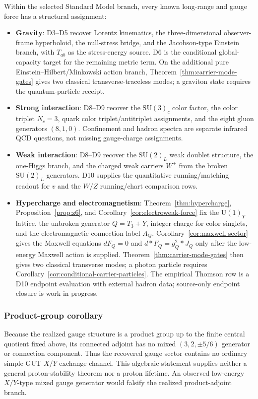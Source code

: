 \documentclass[11pt]{article}
\newcommand{\SU}{\mathrm{SU}}
\newcommand{\U}{\mathrm{U}}
\begin{document}
Within the selected Standard Model branch, every known long-range and gauge
force has a structural assignment:
\begin{itemize}[leftmargin=2em]
\item \textbf{Gravity}: D3--D5 recover Lorentz kinematics, the three-dimensional observer-frame hyperboloid, the null-stress bridge, and the Jacobson-type Einstein branch, with \(T_{ab}\) as the stress-energy source. D6 is the conditional global-capacity target for the remaining metric term. On the additional pure Einstein--Hilbert/Minkowski action branch, Theorem~\ref{thm:carrier-mode-gates} gives two classical transverse-traceless modes; a graviton state requires the quantum-particle receipt.
\item \textbf{Strong interaction}: D8--D9 recover the \(\SU(3)_c\) color factor, the color triplet \(N_c=3\), quark color triplet/antitriplet assignments, and the eight gluon generators \((8,1,0)\). Confinement and hadron spectra are separate infrared QCD questions, not missing gauge-charge assignments.
\item \textbf{Weak interaction}: D8--D9 recover the \(\SU(2)_L\) weak doublet structure, the one-Higgs branch, and the charged weak carriers \(W^\pm\) from the broken \(\SU(2)_L\) generators. D10 supplies the quantitative running/matching readout for \(v\) and the \(W/Z\) running/chart comparison rows.
\item \textbf{Hypercharge and electromagnetism}: Theorem~\ref{thm:hypercharge}, Proposition~\ref{prop:z6}, and Corollary~\ref{cor:electroweak-force} fix the \(\U(1)_Y\) lattice, the unbroken generator \(Q=T_3+Y\), integer charge for color singlets, and the electromagnetic connection label \(A_Q\). Corollary~\ref{cor:maxwell-sector} gives the Maxwell equations \(dF_Q=0\) and \(d*F_Q=g_Q^2*J_Q\) only after the low-energy Maxwell action is supplied. Theorem~\ref{thm:carrier-mode-gates} then gives two classical transverse modes; a photon particle requires Corollary~\ref{cor:conditional-carrier-particles}. The empirical Thomson row is a D10 endpoint evaluation with external hadron data; source-only endpoint closure is work in progress.
\end{itemize}

\subsubsection{Product-group corollary}

Because the realized gauge structure is a product group up to the finite
central quotient fixed above, its connected adjoint has no mixed
\((3,2,\pm5/6)\) generator or connection component. Thus the recovered gauge
sector contains no ordinary simple-GUT \(X/Y\) exchange channel. This
algebraic statement supplies neither a general proton-stability theorem nor a
proton lifetime. An observed low-energy \(X/Y\)-type mixed gauge generator
would falsify the realized product-adjoint branch.
\end{document}
